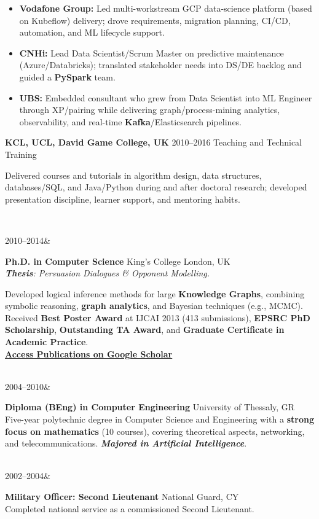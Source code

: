\documentclass[]{../../friggeri-cv}
\renewcommand{\entry}[4]{%
  \parbox[t]{\dimexpr\textwidth-\entryleftinset\relax}{%
    \textbf{#2}%
    {\footnotesize\addfontfeature{Color=lightgray}\hspace{0.6em}#1}%
    \hfill%
    {\small\color{textcolor} #3}\\%
    #4\vspace{\parsep}%
  }\\}
\renewcommand{\entrytwo}[4]{%
  #1&\parbox[t]{14cm}{%
    \textbf{#2}%
    \hfill%
    {\small\color{textcolor} #3}\\%
    #4\vspace{\parsep}%
  }\\}
\begin{document}
\begin{entrylist}
{{        }
        \begin{itemize}[leftmargin=1.1em]
            \item \normalsize\textbf{Vodafone Group:} Led multi-workstream GCP data-science platform (based on Kubeflow) delivery; drove requirements, migration planning, CI/CD, automation, and ML lifecycle support.
            \item \normalsize\textbf{CNHi:} Lead Data Scientist/Scrum Master on predictive maintenance (Azure/Databricks); translated stakeholder needs into DS/DE backlog and guided a \textbf{PySpark} team.
            \item \normalsize\textbf{UBS:} Embedded consultant who grew from Data Scientist into ML Engineer through XP/pairing while delivering graph/process-mining analytics, observability, and real-time \textbf{Kafka}/Elasticsearch pipelines.
        \end{itemize}
    }
    \entry
    {2010--2016}
    {KCL, UCL, David Game College, UK}
    {Teaching and Technical Training}
    {
        {\small
        \setlength{\parindent}{0pt}
        \setlength{\leftskip}{0pt}
        Delivered courses and tutorials in algorithm design, data structures, databases/SQL, and Java/Python during and after doctoral research; developed presentation discipline, learner support, and mentoring habits.

        }
    }
\end{entrylist}
\newpage
\setlength{\parskip}{2pt}
\setlength{\parsep}{0pt}
\begin{entrylist2}
    \entrytwo
        {\small 2010--2014}
        {\small Ph.D. in Computer Science}
        {\small King's College London, UK}
        {\small \emph{\textbf{Thesis}: Persuasion Dialogues \& Opponent Modelling.}

        {\footnotesize Developed logical inference methods for large \textbf{Knowledge Graphs}, combining symbolic reasoning, \textbf{graph analytics}, and Bayesian techniques (e.g., MCMC). Received \textbf{Best Poster Award} at IJCAI 2013 (413 submissions), \textbf{EPSRC PhD Scholarship}, \textbf{Outstanding TA Award}, and \textbf{Graduate Certif\/icate in Academic Practice}.
        \\ \textbf{\textcolor{blue}{\href{https://scholar.google.com/citations?hl=en&user=Rr3KTx8AAAAJ}{\underline{Access Publications on Google Scholar}}}}}
        }
    \entrytwo
        {\small  2004--2010}
        {\small Diploma (BEng) in Computer Engineering}
        {\small University of Thessaly, GR}
        {\footnotesize Five-year polytechnic degree in Computer Science and Engineering with a \textbf{strong focus on mathematics} (10 courses), covering theoretical aspects, networking, and telecommunications. \emph{\textbf{Majored in Artif\/icial Intelligence}}.}
    \entrytwo
        {\small  2002--2004}
        {\small Military Of\/f\/icer: Second Lieutenant}
        {\small National Guard, CY}
        {\small Completed national service as a commissioned Second Lieutenant.}
\end{entrylist2}
\end{document}
